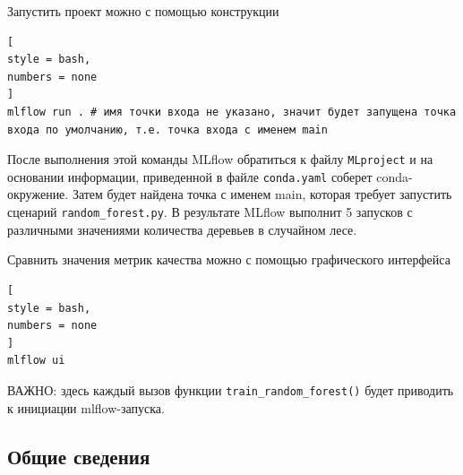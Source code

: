 \documentclass[%
	11pt,
	a4paper,
	utf8,
		]{article}
\begin{document}
Запустить проект можно с помощью конструкции
\begin{lstlisting}[
style = bash,
numbers = none	
]
mlflow run . # имя точки входа не указано, значит будет запущена точка входа по умолчанию, т.е. точка входа с именем main
\end{lstlisting}

После выполнения этой команды MLflow обратиться к файлу \texttt{MLproject} и на основании информации, приведенной в файле \texttt{conda.yaml} соберет conda-окружение. Затем будет найдена точка с именем main, которая требует запустить сценарий \texttt{random\_forest.py}. В результате MLflow выполнит 5 запусков с различными значениями количества деревьев в случайном лесе.

Сравнить значения метрик качества можно с помощью графического интерфейса
\begin{lstlisting}[
style = bash,
numbers = none
]
mlflow ui
\end{lstlisting}

ВАЖНО: здесь каждый вызов функции \texttt{train\_random\_forest()} будет приводить к инициации mlflow-запуска.

\subsection{Общие сведения}
\end{document}
